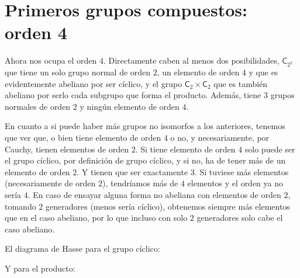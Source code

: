\documentclass[12pt,a4paper,fleqn,spanish,final,openright]{extbook}
\theoremstyle{definition}
\theoremstyle{remark}
\begin{document}
\chapter{Primeros grupos compuestos: orden 4}

Ahora nos ocupa el orden $4$. Directamente caben al menos dos posibilidades, $\textsf{C}_{2^2}$ que tiene un solo grupo normal de orden $2$, un elemento de orden $4$ y que es evidentemente abeliano por ser cíclico, y el grupo $\textsf{C}_{2}     \times     \textsf{C}_{2}$ que es también abeliano por serlo cada subgrupo que forma el producto. Además, tiene $3$ grupos normales de orden $2$ y ningún elemento de orden $4$.

En cuanto a si puede haber más grupos no isomorfos a los anteriores, tenemos que ver que, o bien tiene elemento de orden $4$ o no, y necesariamente, por Cauchy, tienen elementos de orden $2$. Si tiene elemento de orden $4$ solo puede ser el grupo cíclico, por definición de grupo cíclico, y si no, ha de tener más de un elemento de orden $2$. Y tienen que ser exactamente $3$. Si tuviese más elementos (necesariamente de orden $2$), tendríamos más de $4$ elementos y el orden ya no sería $4$. En caso de ensayar alguna forma no abeliana con elementos de orden $2$, tomando $2$ generadores (menos sería cíclico), obtenemos siempre más elementos que en el caso abeliano, por lo que incluso con solo $2$ generadores solo cabe el caso abeliano.

El diagrama de Hasse para el grupo cíclico:

\begin{center}
\end{center}

Y para el producto:
\end{document}
